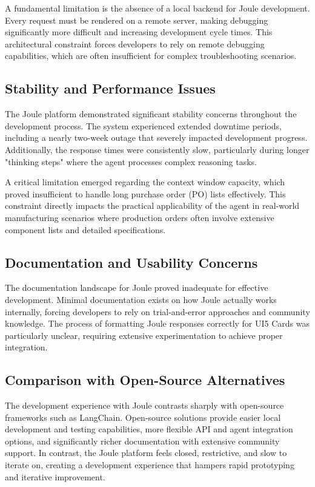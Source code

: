 A fundamental limitation is the absence of a local backend for Joule development. Every request must be rendered on a remote server, making debugging significantly more difficult and increasing development cycle times. This architectural constraint forces developers to rely on remote debugging capabilities, which are often insufficient for complex troubleshooting scenarios.

\subsection{Stability and Performance Issues}

The Joule platform demonstrated significant stability concerns throughout the development process. The system experienced extended downtime periods, including a nearly two-week outage that severely impacted development progress. Additionally, the response times were consistently slow, particularly during longer "thinking steps" where the agent processes complex reasoning tasks.

A critical limitation emerged regarding the context window capacity, which proved insufficient to handle long purchase order (PO) lists effectively. This constraint directly impacts the practical applicability of the agent in real-world manufacturing scenarios where production orders often involve extensive component lists and detailed specifications.

\subsection{Documentation and Usability Concerns}

The documentation landscape for Joule proved inadequate for effective development. Minimal documentation exists on how Joule actually works internally, forcing developers to rely on trial-and-error approaches and community knowledge. The process of formatting Joule responses correctly for UI5 Cards was particularly unclear, requiring extensive experimentation to achieve proper integration.

\subsection{Comparison with Open-Source Alternatives}

The development experience with Joule contrasts sharply with open-source frameworks such as LangChain. Open-source solutions provide easier local development and testing capabilities, more flexible API and agent integration options, and significantly richer documentation with extensive community support. In contrast, the Joule platform feels closed, restrictive, and slow to iterate on, creating a development experience that hampers rapid prototyping and iterative improvement.

